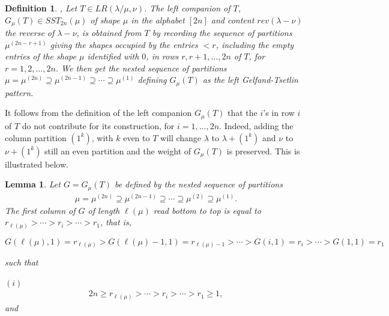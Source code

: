 \documentclass[reqno]{amsart}
\theoremstyle{tplain}
\newtheorem{lem}{Lemma}
\newtheorem{defi}{Definition}
\begin{document}
{\begin{defi}\cite{GZ85,gzpolyed, BZphy}, \cite{akt16}\label{leftcomp} Let $T\in LR(\lambda/\mu,\nu)$. The left companion of $T$, $G_\mu(T)\in SST_{2n}(\mu)$ of  shape $\mu$ in the alphabet $[2n]$ and content $rev(\lambda-\nu)$ the reverse of $\lambda-\nu$, is  obtained from $T$ by recording the sequence of partitions $\mu^{(2n-r+1)}$ giving the
shapes occupied by the entries $<r$, including the empty entries of the shape $\mu$  identified with $0$,  in rows $r, r + 1, \dots , 2n$ of $T$, for $r = 1, 2, \dots, 2n$. We  then get the nested sequence of partitions $\mu=\mu^{(2n)}\supseteq \mu^{(2n-1)}\supseteq \cdots \supseteq\mu^{(1)}$ defining $G_\mu(T)$ as the left Gelfand-Tsetlin pattern.
\end{defi}
It follows from the definition of the left companion $G_\mu(T)$ that the $i$'s in row $i$ of $T$ do not contribute for  its construction, for $i=1,\dots,2n$. Indeed, adding the column partition  $(1^k)$, with $k$ even  to $T$  will change  $\lambda$ to $\lambda+(1^k)$ and $\nu$ to $\nu+(1^k)$ still an even partition and the weight of $G_\mu(T)$ is preserved. This is illustrated below.

\iffalse
\begin{lem} \label{lem:leftcomp}Let $G=G_\mu(T)$ be defined by the nested sequence of partitions
\begin{align}\mu=\mu^{(2n)}\supseteq \mu^{(2n-1)}
\supseteq \cdots \supseteq \mu^{(2)}\supseteq\mu^{(1)}.\label{nestedleft}
\end{align}
The first column of $G$ of length $\ell(\mu)$ read bottom to top is equal to $r_{\ell(\mu)}>\cdots>r_i>\cdots >r_1$, that is,

$$G(\ell(\mu),1)=r_{\ell(\mu)}>G(\ell(\mu)-1,1)=r_{\ell(\mu)-1}>\cdots> G(i,1)= r_i >\cdots > G(1,1)=r_1$$

such that

$(i)$ \begin{align}\label {sequencelength}2n\ge r_{\ell(\mu)}>\cdots>r_i>\cdots >r_1\ge 1,
\end{align}
and


\end{lem}}
\end{document}
